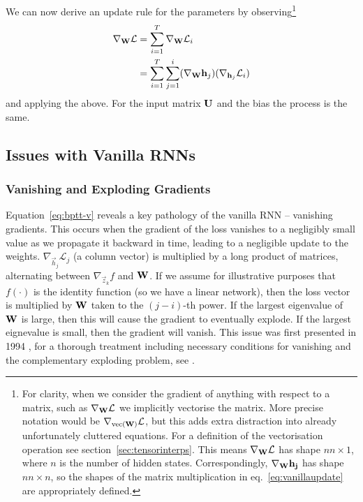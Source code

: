 We can now derive an update rule for the parameters by observing\footnote{For clarity, when we
consider the gradient of anything with respect to a matrix, such as \(\nabla_{\mathbf{W}}\mathcal{L}\)
we implicitly vectorise the matrix. More precise notation would be
\(\nabla_{\operatorname{vec}(\mathbf{W})}\mathcal{L}\), but this adds extra distraction into already unfortunately
 cluttered equations. For a definition of the vectorisation operation see 
section~\ref{sec:tensorinterps}. This means \(\nabla_{\mathbf{W}}\mathcal{L}\) has shape \(nn \times 1\),
where \(n\) is the number of hidden states. Correspondingly, \(\nabla_{\mathbf{W}}\mathbf{h_j}\) has
shape \(nn \times n\), so the shapes of the matrix multiplication in eq.~\eqref{eq:vanillaupdate}
are appropriately defined.
}
\begin{align}
	\nabla_{\mathbf{W}} \mathcal{L} &= \sum_{i=1}^T \nabla_{\mathbf{W}} \mathcal{L}_i \\
	&= \sum_{i=1}^T\sum_{j=1}^i(\nabla_{\mathbf{W}} \mathbf{h}_j)(\nabla_{\mathbf{h}_j} \mathcal{L}_i )
	\label{eq:vanillaupdate}
\end{align} 
and applying the above. For the input matrix \(\mathbf{U}\) and the bias the process is the same.

\subsection{Issues with Vanilla RNNs}
\subsubsection{Vanishing and Exploding Gradients}
Equation~\eqref{eq:bptt-v} reveals a key pathology of the vanilla RNN -- vanishing gradients.
This occurs when the gradient of the loss vanishes to a negligibly small value as we
propagate it backward in time, leading to a negligible update to the weights.
 \(\nabla_{\vec{h}_j}\mathcal{L}_j\) (a column vector) is multiplied by a long product of
 matrices, alternating between \(\nabla_{\vec{z}_k} f\) and \(\mathbf{W}\). If we assume for
 illustrative purposes that \(f(\cdot)\) is the identity function (so we have a linear network),
then the loss vector is multiplied by \(\mathbf{W}\) taken to the \((j-i)\)-th power. If the largest
eigenvalue of \(\mathbf{W}\) is large, then this will cause the gradient to eventually explode.
If the largest eignevalue is small, then the gradient will vanish. This issue was first presented
in 1994 \autocite{Bengio1994}, for a thorough treatment including necessary conditions 
for vanishing and the complementary exploding problem, see \autocite{Pascanu2012}.

